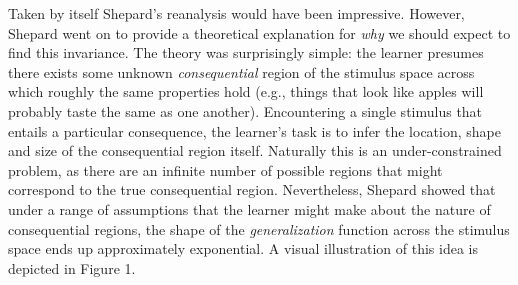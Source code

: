 \documentclass[
  english,
  doc]{apa6}
\begin{document}
Taken by itself Shepard's reanalysis would have been impressive. However, Shepard went on to provide a theoretical explanation for \emph{why} we should expect to find this invariance. The theory was surprisingly simple: the learner presumes there exists some unknown \emph{consequential} region of the stimulus space across which roughly the same properties hold (e.g., things that look like apples will probably taste the same as one another). Encountering a single stimulus that entails a particular consequence, the learner's task is to infer the location, shape and size of the consequential region itself. Naturally this is an under-constrained problem, as there are an infinite number of possible regions that might correspond to the true consequential region. Nevertheless, Shepard showed that under a range of assumptions that the learner might make about the nature of consequential regions, the shape of the \emph{generalization} function across the stimulus space ends up approximately exponential. A visual illustration of this idea is depicted in Figure 1.
\end{document}
